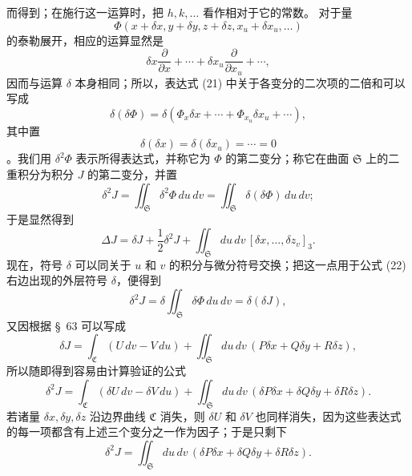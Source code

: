 \documentclass[11pt,a4paper,leqno]{article}
\begin{document}
而得到；在施行这一运算时，把 $h,k,\ldots$ 看作相对于它的常数。
对于量
\begin{equation}\tag{21}
\Phi(x+\delta x,y+\delta y,z+\delta z,x_u+\delta x_u,\ldots)
\end{equation}
的泰勒展开，相应的运算显然是
\[
\delta x\frac{\partial}{\partial x}+\cdots
+\delta x_u\frac{\partial}{\partial x_u}+\cdots,
\]
因而与运算 $\delta$ 本身相同；所以，表达式 (21) 中关于各变分的二次项的二倍和可以写成
\[
\delta(\delta\Phi)
=\delta(\Phi_x\delta x+\cdots+\Phi_{x_u}\delta x_u+\cdots),
\]
其中置
\[
\delta(\delta x)=\delta(\delta x_u)=\cdots=0
\]
。我们用 $\delta^2\Phi$ 表示所得表达式，并称它为 $\Phi$ 的第二变分；称它在曲面
$\mathfrak{S}$ 上的二重积分为积分 $J$ 的第二变分，并置
\begin{equation}\tag{22}
\delta^2J=\iint_{\mathfrak{S}}\delta^2\Phi\,du\,dv
=\iint_{\mathfrak{S}}\delta(\delta\Phi)\,du\,dv;
\end{equation}
于是显然得到
\[
\Delta J=\delta J+\frac12\delta^2J
+\iint_{\mathfrak{S}}du\,dv\,[\delta x,\ldots,\delta z_v]_3.
\]
现在，符号 $\delta$ 可以同关于 $u$ 和 $v$ 的积分与微分符号交换；把这一点用于公式
(22) 右边出现的外层符号 $\delta$，便得到
\[
\delta^2J=\delta\iint_{\mathfrak{S}}\delta\Phi\,du\,dv
=\delta(\delta J),
\]
又因根据 \S~63 可以写成
\begin{equation}\tag{23}
\delta J=\int_{\mathfrak{C}}(U\,dv-V\,du)
+\iint_{\mathfrak{S}}du\,dv\,(P\delta x+Q\delta y+R\delta z),
\end{equation}
所以随即得到容易由计算验证的公式
\[
\delta^2J=\int_{\mathfrak{C}}(\delta U\,dv-\delta V\,du)
+\iint_{\mathfrak{S}}du\,dv\,
(\delta P\delta x+\delta Q\delta y+\delta R\delta z).
\]
若诸量 $\delta x,\delta y,\delta z$ 沿边界曲线 $\mathfrak{C}$ 消失，则 $\delta U$ 和
$\delta V$ 也同样消失，因为这些表达式的每一项都含有上述三个变分之一作为因子；于是只剩下
\[
\delta^2J=\iint_{\mathfrak{S}}du\,dv\,
(\delta P\delta x+\delta Q\delta y+\delta R\delta z).
\]
\end{document}
